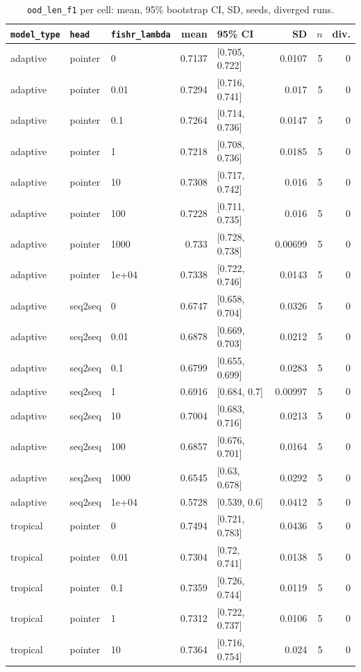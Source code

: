 \documentclass[10pt]{article}
\begin{document}
{\small
\begin{longtable}{lllrlrrr}
\caption{\texttt{ood\_len\_f1} per cell: mean, 95\% bootstrap CI, SD, seeds, diverged runs.}\label{tab:summary-ood_len_f1}\\
\toprule
\texttt{model\_type} & \texttt{head} & \texttt{fishr\_lambda} & mean & 95\% CI & SD & $n$ & div.\\
\midrule
\endhead
adaptive & pointer & 0 & 0.7137 & [0.705, 0.722] & 0.0107 & 5 & 0\\
adaptive & pointer & 0.01 & 0.7294 & [0.716, 0.741] & 0.017 & 5 & 0\\
adaptive & pointer & 0.1 & 0.7264 & [0.714, 0.736] & 0.0147 & 5 & 0\\
adaptive & pointer & 1 & 0.7218 & [0.708, 0.736] & 0.0185 & 5 & 0\\
adaptive & pointer & 10 & 0.7308 & [0.717, 0.742] & 0.016 & 5 & 0\\
adaptive & pointer & 100 & 0.7228 & [0.711, 0.735] & 0.016 & 5 & 0\\
adaptive & pointer & 1000 & 0.733 & [0.728, 0.738] & 0.00699 & 5 & 0\\
adaptive & pointer & 1e+04 & 0.7338 & [0.722, 0.746] & 0.0143 & 5 & 0\\
adaptive & seq2seq & 0 & 0.6747 & [0.658, 0.704] & 0.0326 & 5 & 0\\
adaptive & seq2seq & 0.01 & 0.6878 & [0.669, 0.703] & 0.0212 & 5 & 0\\
adaptive & seq2seq & 0.1 & 0.6799 & [0.655, 0.699] & 0.0283 & 5 & 0\\
adaptive & seq2seq & 1 & 0.6916 & [0.684, 0.7] & 0.00997 & 5 & 0\\
adaptive & seq2seq & 10 & 0.7004 & [0.683, 0.716] & 0.0213 & 5 & 0\\
adaptive & seq2seq & 100 & 0.6857 & [0.676, 0.701] & 0.0164 & 5 & 0\\
adaptive & seq2seq & 1000 & 0.6545 & [0.63, 0.678] & 0.0292 & 5 & 0\\
adaptive & seq2seq & 1e+04 & 0.5728 & [0.539, 0.6] & 0.0412 & 5 & 0\\
tropical & pointer & 0 & 0.7494 & [0.721, 0.783] & 0.0436 & 5 & 0\\
tropical & pointer & 0.01 & 0.7304 & [0.72, 0.741] & 0.0138 & 5 & 0\\
tropical & pointer & 0.1 & 0.7359 & [0.726, 0.744] & 0.0119 & 5 & 0\\
tropical & pointer & 1 & 0.7312 & [0.722, 0.737] & 0.0106 & 5 & 0\\
tropical & pointer & 10 & 0.7364 & [0.716, 0.754] & 0.024 & 5 & 0\\

\end{longtable}}
\end{document}
